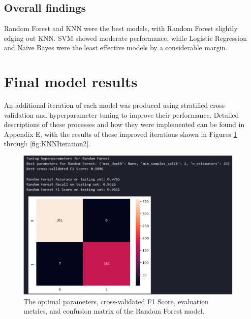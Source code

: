 \documentclass[12pt]{report}
\begin{document}

\subsection{Overall findings}
Random Forest and KNN were the best models, with Random Forest slightly edging out KNN.
SVM showed moderate performance, while Logistic Regression and Naïve Bayes were the least effective models by a considerable margin.

\section{Final model results}\label{sec:FinalResults}
An additional iteration of each model was produced using stratified cross-validation and hyperparameter tuning
to improve their performance.
Detailed descriptions of these processes and how they were implemented can be found in Appendix E, with the results of these improved iterations shown 
in Figures \ref{fig:RFIteration2} through \ref{fig:KNNIteration2}.


\begin{figure}[H]
    \centering
    \includegraphics[width=\linewidth]{ModelDev/Iteration2/Results/RF.png}
    \caption{The optimal parameters, cross-validated F1 Score, evaluation metrics, and confusion matrix of the Random Forest model.}
    \label{fig:RFIteration2}
\end{figure}
\end{document}
